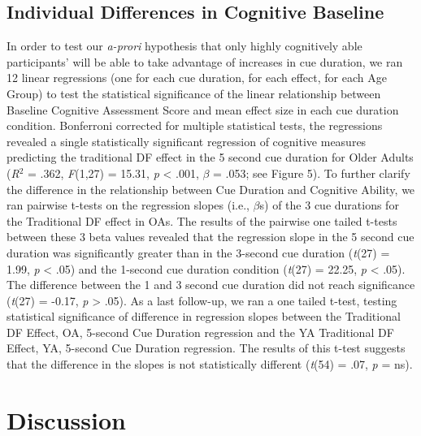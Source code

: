 \documentclass[man]{apa6}
\begin{document}
\subsection*{Individual Differences in Cognitive Baseline}

In order to test our \textit{a-prori} hypothesis that only highly cognitively able participants’ will be able to take advantage of increases in cue duration, we ran 12 linear regressions (one for each cue duration, for each effect, for each Age Group) to test the statistical significance of the linear relationship between Baseline Cognitive Assessment Score and mean effect size in each cue duration condition. Bonferroni corrected for multiple statistical tests, the regressions revealed a single statistically significant regression of cognitive measures predicting the traditional DF effect in the 5 second cue duration for Older Adults (\textit{R}$^{2}$ = .362, \textit{F}(1,27) = 15.31, \textit{p} < .001, $\beta$ = .053; see Figure 5). To further clarify the difference in the relationship between Cue Duration and Cognitive Ability, we ran pairwise t-tests on the regression slopes (i.e., $\beta$s) of the 3 cue durations for the Traditional DF effect in OAs. The results of the pairwise one tailed t-tests between these 3 beta values revealed that the regression slope in the 5 second cue duration was significantly greater than in the 3-second cue duration (\textit{t}(27) = 1.99, \textit{p} < .05) and the 1-second cue duration condition (\textit{t}(27) = 22.25, \textit{p} < .05). The difference between the 1 and 3 second cue duration did not reach significance (\textit{t}(27) = -0.17, \textit{p} > .05). As a last follow-up, we ran a one tailed t-test, testing statistical significance of difference in regression slopes between the Traditional DF Effect, OA, 5-second Cue Duration regression and the YA Traditional DF Effect, YA, 5-second Cue Duration regression. The results of this t-test suggests that the difference in the slopes is not statistically different (\textit{t}(54) = .07, \textit{p} = ns).

\section*{Discussion}
\end{document}

